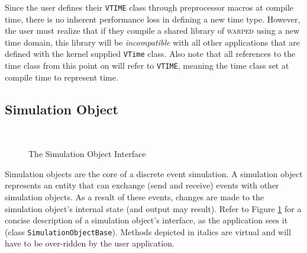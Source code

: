 \documentclass[11pt]{article}
\begin{document}
Since the user defines their {\tt VTIME} class through preprocessor macros
at compile time, there is no inherent performance loss in defining a new
time type.  However, the user must realize that if they compile a shared
library of \textsc{warped} using a new time domain, this library will be
\emph{incompatible} with all other applications that are defined with the
kernel supplied {\tt VTime} class.  Also note that all references to the
time class from this point on will refer to {\tt VTIME}, meaning the time
class set at compile time to represent time.

\subsection{Simulation Object}\label{simobjsection}

\begin{figure}
\begin{center}
  \ 
\end{center}
\caption{The Simulation Object Interface}\label{fig:SimulationObject} 
\end{figure}

Simulation objects are the core of a discrete event simulation.  A
simulation object represents an entity that can exchange (send and
receive) events with other simulation objects.  As a result of these
events, changes are made to the simulation object's internal state (and
output may result).  Refer to Figure \ref{fig:SimulationObject} for a
concise description of a simulation object's interface, as the application
sees it (class {\tt SimulationObjectBase}). Methods depicted in italics
are virtual and will have to be over-ridden by the user application.
\end{document}
